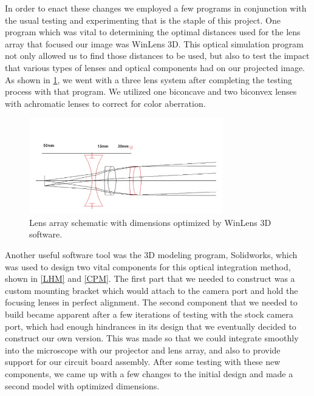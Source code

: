 \documentclass[12pt,a4paper]{article}
\begin{document}
\begin{appendices}
In order to enact these changes we employed a few programs in conjunction with the usual testing and experimenting that is the staple of this project.  One program which was vital to determining the optimal distances used for the lens array that focused our image was WinLens 3D.  This optical simulation program not only allowed us to find those distances to be used, but also to test the impact that various types of lenses and optical components had on our projected image.  As shown in \ref{LAD}, we went with a three lens system after completing the testing process with that program.  We utilized one biconcave and two biconvex lenses with achromatic lenses to correct for color aberration.

\begin{figure}[h]
	\centering
	\includegraphics[width = 0.75\textwidth]{pics/lens_array.jpg}
	\caption[Lens Array Diagram]{\centering Lens array schematic with dimensions optimized by WinLens 3D software.}
	\label{LAD}
\end{figure}

Another useful software tool was the 3D modeling program, Solidworks, which was used to design two vital components for this optical integration method, shown in \ref{LHM} and \ref{CPM}.  The first part that we needed to construct was a custom mounting bracket which would attach to the camera port and hold the focusing lenses in perfect alignment.  The second component that we needed to build became apparent after a few iterations of testing with the stock camera port, which had enough hindrances in its design that we eventually decided to construct our own version.  This was made so that we could integrate smoothly into the microscope with our projector and lens array, and also to provide support for our circuit board assembly.  After some testing with these new components, we came up with a few changes to the initial design and made a second model with optimized dimensions.



\end{appendices}
\end{document}
